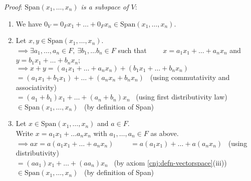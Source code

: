 \documentclass[
  12pt,
  a4paper,
  twoside]{article}
\providecommand{\tightlist}{%
  \setlength{\itemsep}{0pt}\setlength{\parskip}{0pt}}
\theoremstyle{plain}
\theoremstyle{definition}
\begin{document}
\emph{Proof}: \emph{\(\mathrm{Span}(x_1, \dots, x_n)\) is a subspace of \(V\)}:

\begin{enumerate}
\def\labelenumi{(\roman{enumi})}
\tightlist
\item
  We have \(0_{V} = 0_{F}x_1 + \dots + 0_{F}x_n \in \mathrm{Span}(x_1, \dots, x_n)\).
\item
  Let \(x,y \in \mathrm{Span}(x_1, \dots, x_n)\).\\
  \(\implies \exists a_1, \dots, a_n \in F, \ \exists b_1, \dots b_n \in F\) such that
  ~~~~\(x= a_1x_1 + \dots + a_nx_n\) and \(y = b_1x_1 + \dots + b_nx_n\);\\
  \(\implies x+y = (a_1x_1 + \dots + a_nx_n) + (b_1x_1 + \dots + b_nx_n)\)\\
  \hspace*{0.333em}\hspace*{0.333em}\hspace*{0.333em}\hspace*{0.333em}\(= (a_1x_1 + b_1x_1) + \dots + (a_nx_n + b_nx_n)\) \hfill~{(using commutativity and associativity)}\\
  \hspace*{0.333em}\hspace*{0.333em}\hspace*{0.333em}\hspace*{0.333em}\(= (a_1 + b_1)x_1 + \dots + (a_n + b_n)x_n\) \hfill~{(using first distributivity law)}\\
  \hspace*{0.333em}\hspace*{0.333em}\hspace*{0.333em}\hspace*{0.333em}\(\in \mathrm{Span}(x_1, \dots, x_n)\) \hfill~{(by definition of Span)}
\item
  Let \(x \in \mathrm{Span}(x_1, \dots, x_n)\) and \(a \in F\).\\
  Write \(x= a_1x_1 + \dots a_nx_n\) with \(a_1, \dots, a_n \in F\) as above.\\
  \(\implies ax = a(a_1x_1 + \dots + a_nx_n)\)
  ~~~~\(= a(a_1x_1) + \dots + a(a_nx_n)\) \hfill~{(using distributivity)}\\
  \hspace*{0.333em}\hspace*{0.333em}\hspace*{0.333em}\hspace*{0.333em}\(= (a a_1)x_1 + \dots + (a a_n)x_n\) \hfill~{(by axiom \ref{cnj:defn-vectorspace}(iii))}\\
  \hspace*{0.333em}\hspace*{0.333em}\hspace*{0.333em}\hspace*{0.333em}\(\in \mathrm{Span}(x_1, \dots, x_n)\) \hfill~{(by definition of Span)}
\end{enumerate}
\end{document}
